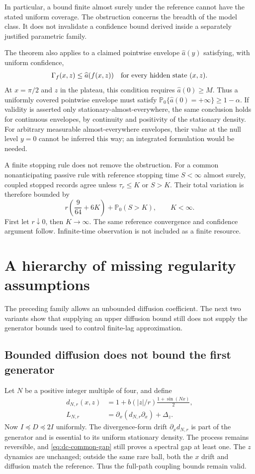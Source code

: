 In particular, a bound finite almost surely under the reference cannot
have the stated uniform coverage. The obstruction concerns the breadth
of the model class. It does not invalidate a confidence bound derived
inside a separately justified parametric family.

The theorem also applies to a claimed pointwise envelope
$\widehat a(y)$ satisfying, with uniform confidence,
\[
 \Gamma_f(x,z)\leq\widehat a(f(x,z))\quad
 \hbox{for every hidden state }(x,z).
\]
At $x=\pi/2$ and $z$ in the plateau, this condition requires
$\widehat a(0)\geq M$. Thus a uniformly covered pointwise envelope must
satisfy $\mathbb P_0\{\widehat a(0)=+\infty\}\geq1-\alpha$.
If validity is asserted only stationary-almost-everywhere, the same
conclusion holds for continuous envelopes, by continuity and positivity
of the stationary density. For arbitrary measurable almost-everywhere
envelopes, their value at the null level $y=0$ cannot be inferred this way;
an integrated formulation would be needed.

A finite stopping rule does not remove the obstruction. For a common
nonanticipating passive rule with reference stopping time $S<\infty$
almost surely, coupled stopped records agree unless $\tau_r\leq K$ or
$S>K$. Their total variation is therefore bounded by
\[
 r\left(\frac9{64}+6K\right)+\mathbb P_0(S>K),\qquad K<\infty.
\]
First let $r\downarrow0$, then $K\to\infty$. The same reference convergence
and confidence argument follow. Infinite-time observation is not included
as a finite resource.

\section{A hierarchy of missing regularity assumptions}

The preceding family allows an unbounded diffusion coefficient. The next
two variants show that supplying an upper diffusion bound still does not
supply the generator bounds used to control finite-lag approximation.

\subsection{Bounded diffusion does not bound the first generator}

Let $N$ be a positive integer multiple of four, and define
\begin{equation}
 \begin{split}
 d_{N,r}(x,z)&=1+b(|z|/r)\frac{1+\sin(Nx)}2,\\
 L_{N,r}&=\partial_x(d_{N,r}\partial_x)+\Delta_z.
 \end{split}
 \label{eq:dc-bounded-first-generator}
\end{equation}
Now $I\preceq D\preceq2I$ uniformly. The divergence-form drift
$\partial_xd_{N,r}$ is part of the generator and is essential to its
uniform stationary density. The process remains reversible, and
\eqref{eq:dc-common-gap} still proves a spectral gap at least one.
The $z$ dynamics are unchanged; outside the same rare ball, both the
$x$ drift and diffusion match the reference. Thus the full-path coupling
bounds remain valid.

